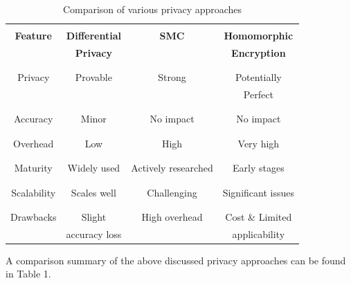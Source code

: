 \documentclass[conference]{IEEEtran}
\begin{document}
\begin{table}[htbp]
\caption{Comparison of various privacy approaches}
\begin{center}
\begin{tabular}{|c|c|c|c|}
\hline
{}& {}& {}& {}\\[-0.5em]
\textbf{Feature}&\textbf{Differential}&\textbf{SMC}&\textbf{Homomorphic} \\
\textbf{}&\textbf{Privacy}&\textbf{}&\textbf{Encryption} \\
{}& {}& {}& {}\\[-0.5em]
\hline
{}& {}& {}& {}\\[-0.5em]
Privacy& Provable& Strong& Potentially \\
{}& {}& {}& Perfect \\
{}& {}& {}& {}\\[-0.5em]
\hline
{}& {}& {}& {}\\[-0.5em]
Accuracy& Minor& No impact& No impact \\
{}& {}& {}& {}\\[-0.5em]
\hline
{}& {}& {}& {}\\[-0.5em]
Overhead& Low& High& Very high \\
{}& {}& {}& {}\\[-0.5em]
\hline
{}& {}& {}& {}\\[-0.5em]
Maturity& Widely used& Actively researched& Early stages \\
{}& {}& {}& {}\\[-0.5em]
\hline
{}& {}& {}& {}\\[-0.5em]
Scalability& Scales well& Challenging& Significant issues \\
{}& {}& {}& {}\\[-0.5em]
\hline
{}& {}& {}& {}\\[-0.5em]
Drawbacks& Slight& High overhead& Cost \& Limited \\
& accuracy loss& & applicability \\
\hline
\end{tabular}
\label{tab1}
\end{center}
\end{table}

A comparison summary of the above discussed privacy approaches can be found in Table 1.
\end{document}
